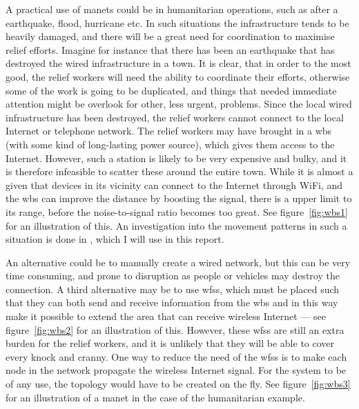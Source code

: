 A practical use of \acp{manet} could be in humanitarian operations, such as after a earthquake, flood, hurricane etc. In such situations the infrastructure tends to be heavily damaged, and there will be a great need for coordination to maximise relief efforts. Imagine for instance that there has been an earthquake that has destroyed the wired infrastructure in a town. It is clear, that in order to the most good, the relief workers will need the ability to coordinate their efforts, otherwise some of the work is going to be duplicated, and things that needed immediate attention might be overlook for other, less urgent, problems. Since the local wired infrastructure has been destroyed, the relief workers cannot connect to the local Internet or telephone network. The relief workers may have brought in a \ac{wbs} (with some kind of long-lasting power source), which gives them access to the Internet. However, such a station is likely to be very expensive and bulky, and it is therefore infeasible to scatter these around the entire town. While it is almost a given that devices in its vicinity can connect to the Internet through WiFi, and the \ac{wbs} can improve the distance by boosting the signal, there is a upper limit to its range, before the noise-to-signal ratio becomes too great. See figure~\ref{fig:wbs1} for an illustration of this. An investigation into the movement patterns in such a situation is done in \cite{disasterArea}, which I will use in this report.


An alternative could be to manually create a wired network, but this can be very time consuming, and prone to disruption as people or vehicles may destroy the connection. A third alternative may be to use \acp{wfs}, which must be placed such that they can both send and receive information from the \ac{wbs} and in this way  make it possible to extend the area that can receive wireless Internet --- see  figure~\ref{fig:wbs2} for an illustration of this. However, these \acp{wfs} are still an extra burden for the relief workers, and it is unlikely that they will be able to cover every knock and cranny. One way to reduce the need of the \acp{wfs} is to make each node in the network propagate the wireless Internet signal. For the system to be of any use, the topology would have to be created on the fly. See figure~\ref{fig:wbs3} for an illustration of a \ac{manet} in the case of the humanitarian example.

